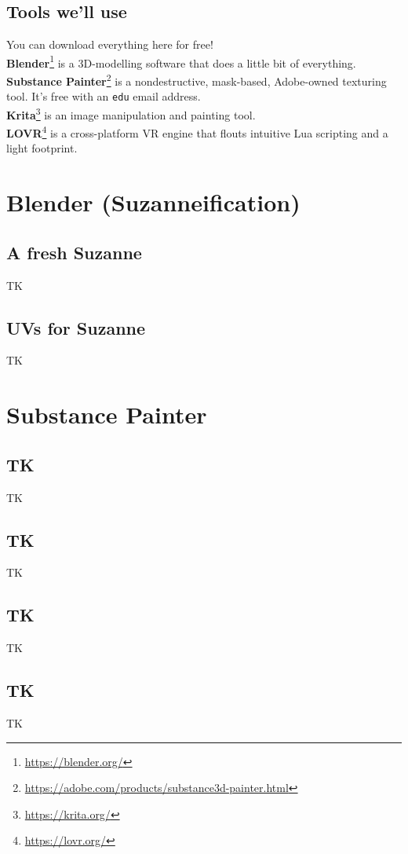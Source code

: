 \documentclass[12pt, letterpaper]{article}
\begin{document}
\subsection{Tools we'll use}
You can download everything here for free!\\
\textbf{Blender}\footnote{\url{https://blender.org/}} is a 3D-modelling software that does a little bit of everything.\\
\textbf{Substance Painter}\footnote{\url{https://adobe.com/products/substance3d-painter.html}} is a nondestructive, mask-based, Adobe-owned texturing tool. It's free with an \verb|edu| email address.\\
\textbf{Krita}\footnote{\url{https://krita.org/}} is an image manipulation and painting tool.\\
\textbf{LOVR}\footnote{\url{https://lovr.org/}} is a cross-platform VR engine that flouts intuitive Lua scripting and a light footprint.

\section{Blender (Suzanneification)}

\subsection{A fresh Suzanne}
TK

\subsection{UVs for Suzanne}
TK

\section{Substance Painter}

\subsection{TK}
TK

\subsection{TK}
TK

\subsection{TK}
TK

\subsection{TK}
TK
\end{document}

